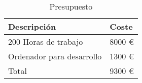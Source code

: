 \begin{table}[!ht]
\begin{center}
\begin{tabular}{|p{80mm}|p{40mm}|} \hline 
\textbf{Descripción } & \textbf{Coste} \\ \hline
200 Horas de trabajo &
8000 \euro
\\
\hline

Ordenador para desarrollo &
1300 \euro
\\
\hline

Total &
9300 \euro
\\
\hline

\end{tabular}
\end{center}
\caption{Presupuesto}
\label{table:resOthers}
\end{table}

